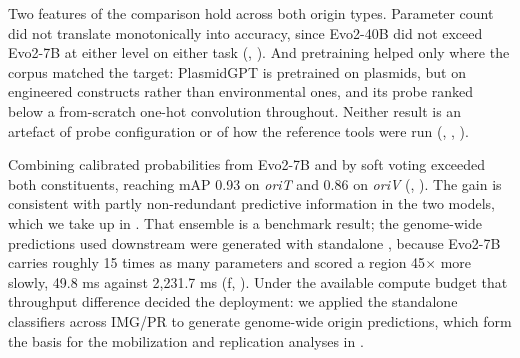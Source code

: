 Two features of the comparison hold across both origin types. Parameter count
did not translate monotonically into accuracy, since Evo2-40B did not exceed
Evo2-7B at either level on either task (,
).
And pretraining helped only where the corpus matched the target: PlasmidGPT is
pretrained on plasmids, but on engineered constructs rather than environmental
ones, and its probe ranked below a from-scratch one-hot convolution throughout.
Neither result is an artefact of probe configuration or of how the reference
tools were run (, ,
).

Combining calibrated probabilities from Evo2-7B and \model by soft voting
exceeded both constituents, reaching mAP 0.93 on \emph{oriT} and 0.86 on
\emph{oriV} (, ). The gain is
consistent with partly non-redundant predictive information in the two models,
which we take up in . That ensemble is a benchmark
result; the genome-wide predictions used downstream were generated with
standalone \model, because Evo2-7B carries roughly 15 times as many
parameters and scored a region 45$\times$ more slowly, 49.8 ms against
2,231.7 ms (f, ). Under the available
compute budget that throughput difference decided the deployment: we applied
the standalone \model classifiers across IMG/PR to generate genome-wide origin
predictions, which form the basis for the mobilization and replication
analyses in .
